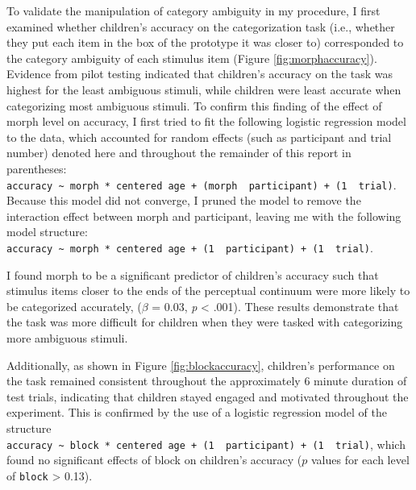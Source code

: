 \documentclass[,man,floatsintext]{apa6}
\begin{document}
To validate the manipulation of category ambiguity in my procedure, I first examined whether children's accuracy on the categorization task (i.e., whether they put each item in the box of the prototype it was closer to) corresponded to the category ambiguity of each stimulus item (Figure \ref{fig:morphaccuracy}). Evidence from pilot testing indicated that children's accuracy on the task was highest for the least ambiguous stimuli, while children were least accurate when categorizing most ambiguous stimuli. To confirm this finding of the effect of morph level on accuracy, I first tried to fit the following logistic regression model to the data, which accounted for random effects (such as participant and trial number) denoted here and throughout the remainder of this report in parentheses: \texttt{accuracy\ \textasciitilde{}\ morph\ *\ centered\ age\ +\ (morph\ \textbar{}\ participant)\ +\ (1\ \textbar{}\ trial)}. Because this model did not converge, I pruned the model to remove the interaction effect between morph and participant, leaving me with the following model structure: \texttt{accuracy\ \textasciitilde{}\ morph\ *\ centered\ age\ +\ (1\ \textbar{}\ participant)\ +\ (1\ \textbar{}\ trial)}.

I found morph to be a significant predictor of children's accuracy such that stimulus items closer to the ends of the perceptual continuum were more likely to be categorized accurately, (\(\beta\) = 0.03, \emph{p} \textless{} .001). These results demonstrate that the task was more difficult for children when they were tasked with categorizing more ambiguous stimuli.

Additionally, as shown in Figure \ref{fig:blockaccuracy}, children's performance on the task remained consistent throughout the approximately 6 minute duration of test trials, indicating that children stayed engaged and motivated throughout the experiment. This is confirmed by the use of a logistic regression model of the structure \texttt{accuracy\ \textasciitilde{}\ block\ *\ centered\ age\ +\ (1\ \textbar{}\ participant)\ +\ (1\ \textbar{}\ trial)}, which found no significant effects of block on children's accuracy (\(p\) values for each level of \texttt{block} \textgreater{} 0.13).
\end{document}
